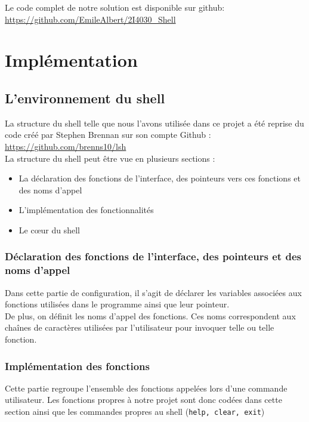 \documentclass[10pt,a4paper]{article}
\begin{document}
Le code complet de notre solution est disponible sur github:
\url{https://github.com/EmileAlbert/2I4030_Shell}
\section{Implémentation}
\subsection{L'environnement du shell}
La structure du shell telle que nous l'avons utilisée dans ce projet a été reprise du code créé par Stephen Brennan sur son compte Github : \url{https://github.com/brenns10/lsh}\\

La structure du shell peut être vue en plusieurs sections :
\begin{itemize}
\item La déclaration des fonctions de l'interface, des pointeurs vers ces fonctions et des noms d'appel
\item L'implémentation des fonctionnalités
\item Le c\oe{}ur du shell 
\end{itemize}

\subsubsection{Déclaration des fonctions de l'interface, des pointeurs et des noms d'appel}
Dans cette partie de configuration, il s'agit de déclarer les variables associées aux fonctions utilisées dans le programme ainsi que leur pointeur.\\

De plus, on définit les noms d'appel des fonctions. Ces noms correspondent aux chaînes de caractères utilisées par l'utilisateur pour invoquer telle ou telle fonction.

\subsubsection{Implémentation des fonctions}
Cette partie regroupe l'ensemble des fonctions appelées lors d'une commande utilisateur. Les fonctions propres à notre projet sont donc codées dans cette section ainsi que les commandes propres au shell (\texttt{help, clear, exit})
\end{document}
